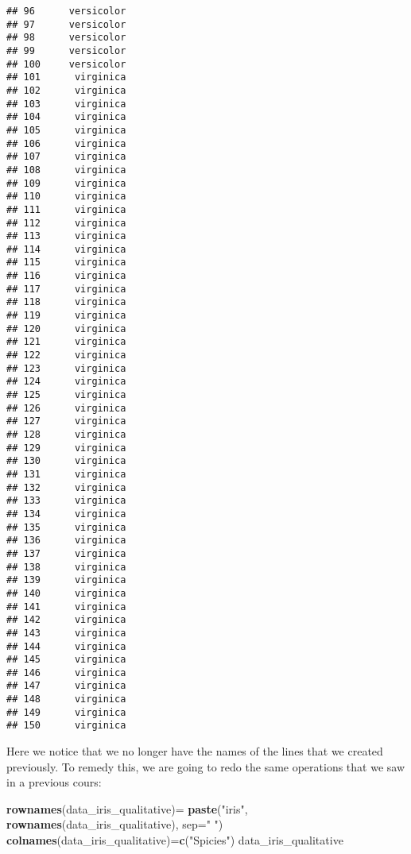 \documentclass[
]{article}
\newenvironment{Shaded}{\begin{snugshade}}{\end{snugshade}}
\newcommand{\AttributeTok}[1]{\textcolor[rgb]{0.13,0.29,0.53}{#1}}
\newcommand{\FunctionTok}[1]{\textcolor[rgb]{0.13,0.29,0.53}{\textbf{#1}}}
\newcommand{\NormalTok}[1]{#1}
\newcommand{\OtherTok}[1]{\textcolor[rgb]{0.56,0.35,0.01}{#1}}
\newcommand{\StringTok}[1]{\textcolor[rgb]{0.31,0.60,0.02}{#1}}
\begin{document}
\begin{verbatim}
## 96      versicolor
## 97      versicolor
## 98      versicolor
## 99      versicolor
## 100     versicolor
## 101      virginica
## 102      virginica
## 103      virginica
## 104      virginica
## 105      virginica
## 106      virginica
## 107      virginica
## 108      virginica
## 109      virginica
## 110      virginica
## 111      virginica
## 112      virginica
## 113      virginica
## 114      virginica
## 115      virginica
## 116      virginica
## 117      virginica
## 118      virginica
## 119      virginica
## 120      virginica
## 121      virginica
## 122      virginica
## 123      virginica
## 124      virginica
## 125      virginica
## 126      virginica
## 127      virginica
## 128      virginica
## 129      virginica
## 130      virginica
## 131      virginica
## 132      virginica
## 133      virginica
## 134      virginica
## 135      virginica
## 136      virginica
## 137      virginica
## 138      virginica
## 139      virginica
## 140      virginica
## 141      virginica
## 142      virginica
## 143      virginica
## 144      virginica
## 145      virginica
## 146      virginica
## 147      virginica
## 148      virginica
## 149      virginica
## 150      virginica
\end{verbatim}

Here we notice that we no longer have the names of the lines that we
created previously. To remedy this, we are going to redo the same
operations that we saw in a previous cours:

\begin{Shaded}
\begin{Highlighting}[]
\FunctionTok{rownames}\NormalTok{(data\_iris\_qualitative)}\OtherTok{=} \FunctionTok{paste}\NormalTok{(}\StringTok{"iris"}\NormalTok{, }\FunctionTok{rownames}\NormalTok{(data\_iris\_qualitative), }\AttributeTok{sep=}\StringTok{" "}\NormalTok{)}
\FunctionTok{colnames}\NormalTok{(data\_iris\_qualitative)}\OtherTok{=}\FunctionTok{c}\NormalTok{(}\StringTok{"Spicies"}\NormalTok{)}
\NormalTok{data\_iris\_qualitative}
\end{Highlighting}
\end{Shaded}
\end{document}
